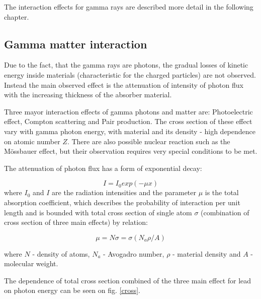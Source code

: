 \par

The interaction effects for gamma rays are described more detail in the following chapter.



\subsection{Gamma matter interaction}

Due to the fact, that the gamma rays are photons, the gradual losses of kinetic energy inside materials (characteristic for the charged particles) are not observed. Instead the main observed effect is the attenuation of intensity of photon flux with the increasing thickness of the absorber material. 

\par
Three mayor interaction effects of gamma photons and matter are: Photoelectric effect, Compton scattering and Pair production. The cross section of these effect vary with gamma photon energy, with material and its density - high dependence on atomic number $Z$. There are also possible nuclear reaction such as the Mössbauer effect, but their observation requires very special conditions to be met.


\par
The attenuation of photon flux has a form of exponential decay:

\begin{equation}
 I = I_{0}exp(-\mu x)
 \end{equation}
where $I_{0}$ and $I$ are the radiation intensities and the parameter $\mu$ is the total absorption coefficient, which describes the probability of interaction per unit length and is bounded with total cross section of single atom $\sigma$ (combination of cross section of three main effects) by relation:

\begin{equation}
 \mu = N \sigma = \sigma(N_{a}\rho/A)
 \end{equation}
 
where $N$ - density of atoms, $N_{a}$ - Avogadro number, $\rho$ - material density and $A$ - molecular weight.

The dependence of total cross section combined of the three main effect for lead on photon energy can be seen on fig. \ref{cross}.

